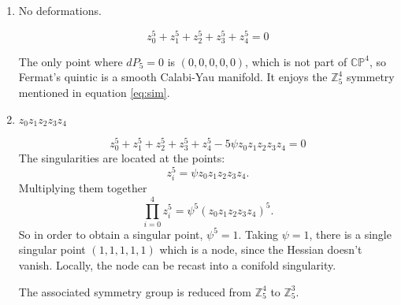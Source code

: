 \begin{enumerate}
  \item No deformations.

    \begin{equation}
    z_0^5+z_1^5+z_2^5+z_3^5+z_4^5=0
    \end{equation}

    The only point where $dP_5=0$ is $(0,0,0,0,0)$, which 
    is not part of $\mathbb{CP}^4$, so Fermat's quintic is a smooth Calabi-Yau manifold. 
    It enjoys the $\mathbb{Z}_5^4$ symmetry mentioned in equation \eqref{eq:sim}.

  \item $z_0z_1z_2z_3z_4$

    \begin{equation}
    z_0^5+z_1^5+z_2^5+z_3^5+z_4^5- 5\psi z_0z_1z_2z_3z_4=0
    \end{equation}
    The singularities are located at the points:
    \begin{equation}
      z_i^5=\psi z_0z_1z_2z_3z_4.
    \end{equation}
    Multiplying them together
    \begin{equation}
      \prod_{i=0}^4 z_i^5=\psi^5 ( z_0z_1z_2z_3z_4 )^5.
    \end{equation}
    So in order to obtain a singular point, $\psi^5=1$.
    Taking $\psi=1$, there is a single singular point $(1,1,1,1,1)$ which is a node, since the Hessian doesn't vanish.
    Locally, the node can be recast into a conifold singularity.

    The associated symmetry group is reduced from $\mathbb{Z}_5^4$ to $\mathbb Z_5^3$.


\end{enumerate}
